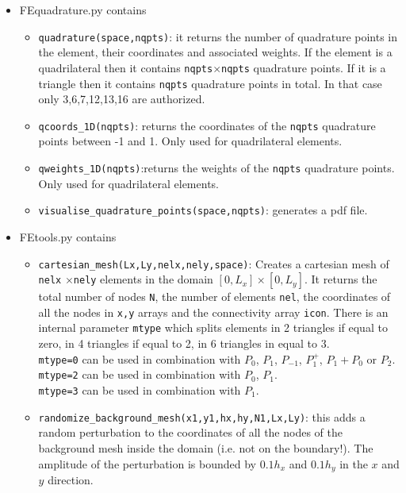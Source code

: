 \begin{itemize}
\item {\pythonfile FEquadrature.py} contains
\begin{itemize}
\item \lstinline{quadrature(space,nqpts)}: it returns the number of quadrature points in the element, 
their coordinates and associated weights. If the element is a quadrilateral then it contains 
\lstinline{nqpts}$\times$\lstinline{nqpts} quadrature points. 
If it is a triangle then it contains \lstinline{nqpts} quadrature points in total. 
In that case only 3,6,7,12,13,16 are authorized.   
\item \lstinline{qcoords_1D(nqpts)}: returns the coordinates of the \lstinline{nqpts} quadrature points between -1 and 1.
Only used for quadrilateral elements.
\item \lstinline{qweights_1D(nqpts)}:returns the weights of the \lstinline{nqpts} quadrature points.
Only used for quadrilateral elements.
\item \lstinline{visualise_quadrature_points(space,nqpts)}: generates a pdf file.
\end{itemize}


\item {\pythonfile FEtools.py} contains

\begin{itemize}
\item \lstinline{cartesian_mesh(Lx,Ly,nelx,nely,space)}: Creates a cartesian mesh of \lstinline{nelx}
$\times$\lstinline{nely} elements in the domain $[0,L_x]\times[0,L_y]$. It returns the total 
number of nodes \lstinline{N}, the number of elements \lstinline{nel}, the coordinates of all the 
nodes in \lstinline{x,y} arrays and the connectivity array \lstinline{icon}.
There is an internal parameter \lstinline{mtype} which splits elements in 2 triangles 
if equal to zero, in 4 triangles if equal to 2, in 6 triangles in equal to 3.\\
\lstinline|mtype=0| can be used in combination with  $P_0$, $P_1$, $P_{-1}$, $P_1^+$, $P_1+P_0$ or $P_2$.\\
\lstinline|mtype=2| can be used in combination with  $P_0$, $P_1$.\\ 
\lstinline|mtype=3| can be used in combination with  $P_1$. 


\item \lstinline{randomize_background_mesh(x1,y1,hx,hy,N1,Lx,Ly)}: this adds a random perturbation
to the coordinates of all the nodes of the background mesh inside the domain (i.e. not on the boundary!). 
The amplitude of the perturbation is bounded by $0.1h_x$ and $0.1h_y$ in the $x$ and $y$ direction.


\end{itemize}
\end{itemize}
